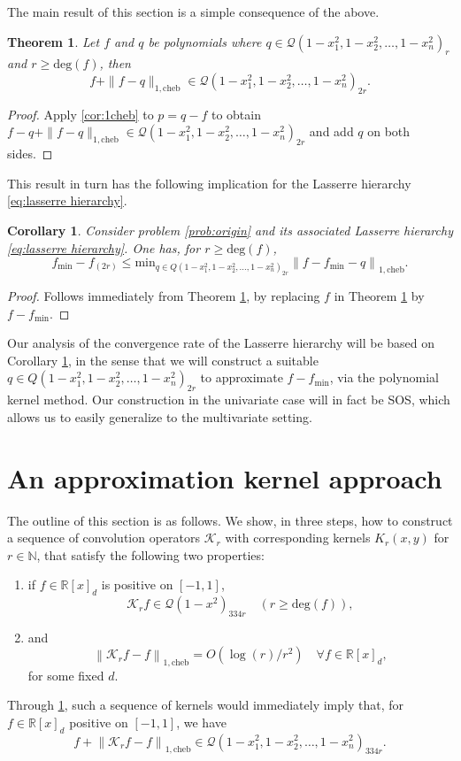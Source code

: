 \documentclass[11pt]{article}
\newcommand{\N}{\mathbb{N}}
\newcommand{\R}{\mathbb{R}}
\renewcommand{\min}{\mathrm{min}}
\newtheorem{theorem}{Theorem}
\newtheorem{corollary}[defin]{Corollary}
\theoremstyle{definition}
\newcommand{\cheb}{{1,\mathrm{cheb}}}
\begin{document}
The main result of this section is a simple consequence of the above.
\begin{theorem} \label{lem:1approx}
    Let $f$ and $q$ be polynomials where $q \in \mathcal Q(1-x_1^2,1-x_2^2,\ldots, 1-x_n^2)_{r}$ and $r\ge \mathrm{deg}(f)$, then
    \[
    f+ \|f-q\|_\cheb \in \mathcal Q(1-x_1^2,1-x_2^2,\ldots, 1-x_n^2)_{2r}.
    \]
\end{theorem}
\begin{proof}
    Apply \cref{cor:1cheb} to $p = q-f$ to obtain
    $f - q + \|f-q\|_\cheb \in \mathcal Q(1-x_1^2,1-x_2^2,\ldots, 1-x_n^2)_{2r}$ and add $q$ on both sides.
\end{proof}

This result in turn has the following implication for the Lasserre hierarchy \eqref{eq:lasserre hierarchy}.
\begin{corollary}
\label{cor:1norm}
Consider problem \eqref{prob:origin} and its associated Lasserre hierarchy \eqref{eq:lasserre hierarchy}.
One has, for $r \ge \mathrm{deg}(f)$,
\[
f_\min - f_{(2r)} \le \min_{q \in Q(1-x_1^2,1-x_2^2,\ldots, 1-x_n^2)_{2r}} \left\| f - f_\min - q\right\|_\cheb.
\]
\end{corollary}
\begin{proof}
Follows immediately from Theorem \ref{lem:1approx}, by replacing $f$ in Theorem \ref{lem:1approx} by $f-f_\min$.
\end{proof}
Our analysis of the convergence rate of the Lasserre hierarchy will be based on Corollary \ref{cor:1norm}, in the sense that
we will construct a suitable $q \in Q(1-x_1^2,1-x_2^2,\ldots, 1-x_n^2)_{2r}$ to approximate $f - f_\min$, via the polynomial kernel method.
Our construction in the univariate case will in fact be SOS, which allows us to easily generalize to the multivariate setting. %

\section{An approximation kernel approach}
\label{sec:uni}



The outline of this section is as follows.
We show, in three steps, how to construct a sequence of convolution operators $\mathcal{K}_r$  with corresponding kernels
$K_r(x,y)$ for $r \in \N$, that satisfy the following two properties:
\begin{enumerate}
    \item
if $f \in \R[x]_d$ is positive on $[-1,1]$,
    \[
 \mathcal{K}_rf   \in \mathcal Q(1-x^2)_{334r} %
 \quad(r\ge \mathrm{deg}(f)),
\]
\item
and
\[
\left\| \mathcal{K}_rf - f\right\|_\cheb = O(\log(r)/r^2) \quad \forall f \in \R[x]_d,
\]
for some fixed $d$.
\end{enumerate}
Through \cref{lem:1approx}, such a sequence of kernels would immediately imply that, for $f \in \R[x]_d$ positive on $[-1,1]$, we have
\[
f+ \left\| \mathcal{K}_rf - f\right\|_\cheb \in \mathcal Q(1-x_1^2,1-x_2^2,\ldots, 1-x_n^2)_{334r}.
\]
\end{document}
